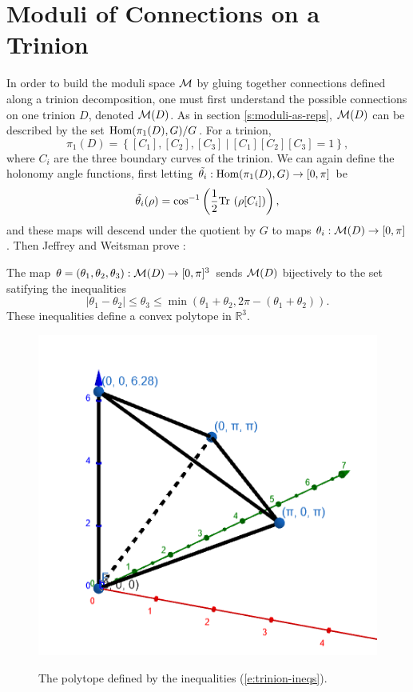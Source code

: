 \section{Moduli of Connections on a Trinion}
	In order to build the moduli space $\mathcal{M}$ by gluing together connections defined along a trinion decomposition, one must first understand the possible connections on one trinion $D$, denoted $\mathcal{M}(D)$. As in section \ref{s:moduli-as-reps}, $\mathcal{M}(D)$ can be described by the set $\text{Hom}(\pi_1(D),G)/G$. For a trinion, 
	\begin{equation}
		\pi_1(D) = \left\{
		[C_1], [C_2], [C_3] ~|~ [C_1][C_2][C_3]  =1
		\right\},
	\end{equation}
	where $C_i$ are the three boundary curves of the trinion. We can again define the holonomy angle functions, first letting $\tilde{\theta_i}:\text{Hom}(\pi_1(D),G) \to [0,\pi]$ be
	\begin{equation}
		\label{e:thetacoords}
		\tilde{\theta_i}(\rho) = \cos^{-1}\left(\frac{1}{2}\text{Tr }(\rho[C_i])\right),
	\end{equation}
	and these maps will descend under the quotient by $G$ to maps $\theta_i:\mathcal{M}(D)\to [0,\pi]$. Then Jeffrey and Weitsman prove \cite[Proposition 3.1]{jeffrey_bohr-sommerfeld_1992}:
	\begin{theorem}[]
		The map $\theta = (\theta_1, \theta_2, \theta_3):\mathcal{M}(D)\to[0,\pi]^3$ sends $\mathcal{M}(D)$ bijectively to the set satifying the inequalities
		\begin{equation}
			|\theta_1 - \theta_2| \leq \theta_3 \leq \min(\theta_1 + \theta_2, 2\pi - (\theta_1 + \theta_2)).
			\label{e:trinion-ineqs}
		\end{equation}
		These inequalities define a convex polytope in $\mathbb{R}^3$.
	\end{theorem}

	\begin{figure}[h]
	\centering
	\includegraphics[width=0.5\linewidth]{polytope.png}\label{fig:polytope}
	\caption{The polytope defined by the inequalities (\ref{e:trinion-ineqs}).}
	\end{figure}

